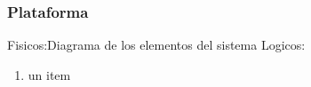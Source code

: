 


\subsubsection{Plataforma}
Fisicos:Diagrama de los elementos del sistema
Logicos:
\begin{enumerate}
	\item un item
\end{enumerate}
